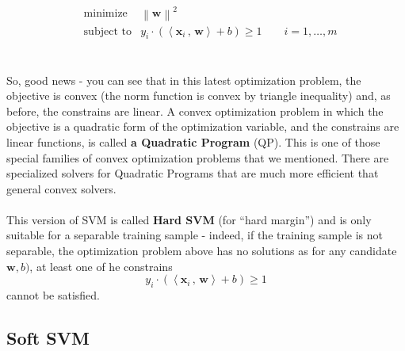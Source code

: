 \documentclass[11pt]{article}
\newcommand{\norm}[1]{\left\| #1\right\|}
\newcommand{\innerr}[2]{{\left\langle #1\,,\,#2 \right\rangle}}
\newcommand{\VV}[1]{\mathbf{#1}}
\begin{document}
    \begin{eqnarray*}
      & \text{minimize}   &  \norm {\VV{w}}^2 \\
     & \text{subject to} &  y_i \cdot \left( \innerr{\VV{x}_i}{\VV{w}}
      +b \right) \geq 1  \qquad 
i=1,\ldots,m
    \end{eqnarray*}
    \\~\\ So, good news - you can see that in this latest optimization problem,
    the objective is convex (the norm function is convex by triangle inequality)
    and, as before, the constrains are linear. 
    A convex optimization problem in which the objective is a quadratic form of
    the optimization variable, and the constrains are linear functions, is
    called {\bf a Quadratic Program} (QP). This is one of those special families
    of convex optimization problems that we mentioned. There are specialized
    solvers for Quadratic Programs that are much more efficient that general
    convex solvers. 
  \\~\\
  This version of SVM is called {\bf Hard SVM} (for ``hard margin'') and is
  only suitable for a separable training sample - indeed, if the training sample
  is not separable, the optimization problem above has no solutions as for any
candidate $\VV{w},b)$, at least
  one of he 
  constrains 
  \[
    y_i \cdot \left( \innerr{\VV{x}_i}{\VV{w}}
      +b \right) \geq 1  
  \]
  cannot be satisfied. 

  \subsection{Soft SVM}
\end{document}
